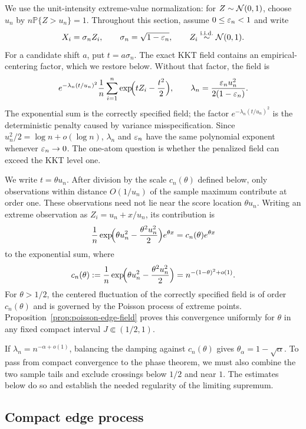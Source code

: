 We use the unit-intensity extreme-value normalization: for
\(Z\sim\mathcal{N}(0,1)\), choose \(u_n\) by \(n\mathbb P\{Z>u_n\}=1\).
Throughout this section, assume \(0\le\varepsilon_n<1\) and write
\[
    X_i=\sigma_n Z_i,\qquad
    \sigma_n=\sqrt{1-\varepsilon_n},\qquad
    Z_i\stackrel{\mathrm{i.i.d.}}{\sim}\mathcal{N}(0,1).
\]
For a candidate shift \(a\), put \(t=a\sigma_n\). The exact KKT field contains
an empirical-centering factor, which we restore below. Without that factor,
the field is
\[
    e^{-\lambda_n(t/u_n)^2}
    \frac1n\sum_{i=1}^n
    \exp\!\Bigl(tZ_i-\frac{t^2}{2}\Bigr),
    \qquad
    \lambda_n=\frac{\varepsilon_nu_n^2}{2(1-\varepsilon_n)}.
\]
The exponential sum is the correctly specified field; the factor
\(e^{-\lambda_n(t/u_n)^2}\) is the deterministic penalty caused by variance
misspecification. Since $u_n^2/2=\log n+o(\log n)$, $\lambda_n$ and
$\varepsilon_n$ have the same polynomial exponent whenever $\varepsilon_n\to0$. The
one-atom question is whether the penalized field can exceed the KKT level one.

We write \(t=\theta u_n\). After division by the scale
\(c_n(\theta)\) defined below, only observations within distance
\(O(1/u_n)\) of the sample maximum contribute at order one. These
observations need not lie near the score location \(\theta u_n\). Writing an
extreme observation as \(Z_i=u_n+x/u_n\), its contribution is
\[
    \frac1n
    \exp\!\Bigl(\theta u_n^2-\frac{\theta^2u_n^2}{2}\Bigr)e^{\theta x}
    =
    c_n(\theta)e^{\theta x}
\]
to the exponential sum, where
\[
    c_n(\theta)
    :=
    \frac1n
    \exp\!\Bigl(\theta u_n^2-\frac{\theta^2u_n^2}{2}\Bigr)
    =
    n^{-(1-\theta)^2+o(1)}.
\]
For $\theta>1/2$, the centered fluctuation of the correctly specified field is
of order $c_n(\theta)$ and is governed by the Poisson process of extreme
points. Proposition~\ref{prop:poisson-edge-field} proves this convergence
uniformly for $\theta$ in any fixed compact interval
$J\Subset(1/2,1)$.

If \(\lambda_n=n^{-\alpha+o(1)}\), balancing the damping against
\(c_n(\theta)\) gives \(\theta_\alpha=1-\sqrt\alpha\). To pass from compact
convergence to the phase theorem, we must also combine the two sample tails
and exclude crossings below \(1/2\) and near \(1\). The estimates below do so
and establish the needed regularity of the limiting supremum.

\subsection{Compact edge process}

